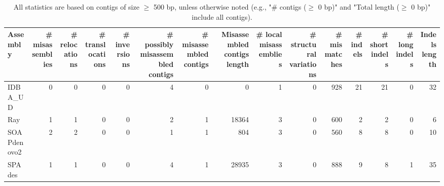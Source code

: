 \documentclass[12pt,a4paper]{article}
\begin{document}
\begin{table}[ht]
\begin{center}
\caption{All statistics are based on contigs of size $\geq$ 500 bp, unless otherwise noted (e.g., "\# contigs ($\geq$ 0 bp)" and "Total length ($\geq$ 0 bp)" include all contigs).}
\begin{tabular}{|l*{14}{|r}|}
\hline
Assembly & \# misassemblies &     \# relocations &     \# translocations &     \# inversions & \# possibly misassembled contigs & \# misassembled contigs & Misassembled contigs length & \# local misassemblies & \# structural variations & \# mismatches & \# indels &     \# short indels &     \# long indels & Indels length \\ \hline
IDBA\_UD & 0 & 0 & 0 & 0 & 4 & 0 & 0 & 1 & 0 & 928 & 21 & 21 & 0 & 32 \\ \hline
Ray & 1 & 1 & 0 & 0 & 2 & 1 & 18364 & 3 & 0 & 600 & 2 & 2 & 0 & 6 \\ \hline
SOAPdenovo2 & 2 & 2 & 0 & 0 & 1 & 1 & 804 & 3 & 0 & 560 & 8 & 8 & 0 & 10 \\ \hline
SPAdes & 1 & 1 & 0 & 0 & 4 & 1 & 28935 & 3 & 0 & 888 & 9 & 8 & 1 & 35 \\ \hline
\end{tabular}
\end{center}
\end{table}
\end{document}
